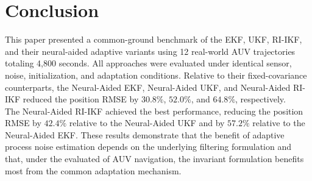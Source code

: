 \documentclass[conference]{IEEEtran}
\begin{document}
\section{Conclusion}
\label{sec:conclusion}
\noindent This paper presented a common-ground benchmark of the EKF, UKF, RI-IKF, and their neural-aided adaptive variants using 12 real-world AUV trajectories totaling 4,800 seconds. All approaches were evaluated under identical sensor, noise, initialization, and adaptation conditions. Relative to their fixed-covariance counterparts, the Neural-Aided EKF, Neural-Aided UKF, and Neural-Aided RI-IKF reduced the position RMSE by $30.8\%$, $52.0\%$, and $64.8\%$, respectively. \\
\noindent The Neural-Aided RI-IKF achieved the best performance, reducing the position RMSE by $42.4\%$ relative to the Neural-Aided UKF and by $57.2\%$ relative to the Neural-Aided EKF. These results demonstrate that the benefit of adaptive process noise estimation depends on the underlying filtering formulation and that, under the evaluated of AUV navigation, the invariant formulation benefits most from the common adaptation mechanism. 
\end{document}
